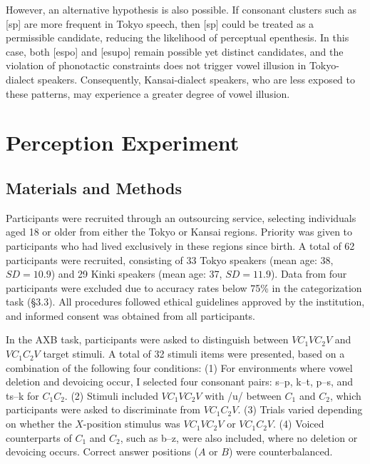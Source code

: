 However, an alternative hypothesis is also possible.  
If consonant clusters such as [sp] are more frequent in Tokyo speech,  
then [sp] could be treated as a permissible candidate,
reducing the likelihood of perceptual epenthesis.
In this case, both [espo] and [esupo] remain possible yet distinct candidates,  
and the violation of phonotactic constraints does not trigger vowel illusion in Tokyo-dialect speakers.  
Consequently, Kansai-dialect speakers, who are less exposed to these patterns,  
may experience a greater degree of vowel illusion.  

\section{Perception Experiment}

\subsection{Materials and Methods}

Participants were recruited through an outsourcing service, selecting individuals aged 18 or older from either the Tokyo or Kansai regions. Priority was given to participants who had lived exclusively in these regions since birth. A total of 62 participants were recruited, consisting of 33 Tokyo speakers (mean age: 38, $SD = 10.9$) and 29 Kinki speakers (mean age: 37, $SD = 11.9$). Data from four participants were excluded due to accuracy rates below 75\% in the categorization task (\S3.3). All procedures followed ethical guidelines approved by the institution, and informed consent was obtained from all participants.

In the AXB task, participants were asked to distinguish between $VC_\text{1}VC_\text{2}V$ and $VC_\text{1}C_\text{2}V$ target stimuli. A total of 32 stimuli items were presented, based on a combination of the following four conditions: (1) For environments where vowel deletion and devoicing occur, I selected four consonant pairs: s--p, k--t, p--s, and ts--k for $C_\text{1}C_\text{2}$. (2) Stimuli included $VC_\text{1}VC_\text{2}V$ with /u/ between $C_\text{1}$ and $C_\text{2}$, which participants were asked to discriminate from $VC_\text{1}C_\text{2}V$. (3) Trials varied depending on whether the $X$-position stimulus was $VC_\text{1}VC_\text{2}V$ or $VC_\text{1}C_\text{2}V$. (4) Voiced counterparts of $C_\text{1}$ and $C_\text{2}$, such as b--z, were also included, where no deletion or devoicing occurs. Correct answer positions ($A$ or $B$) were counterbalanced.

